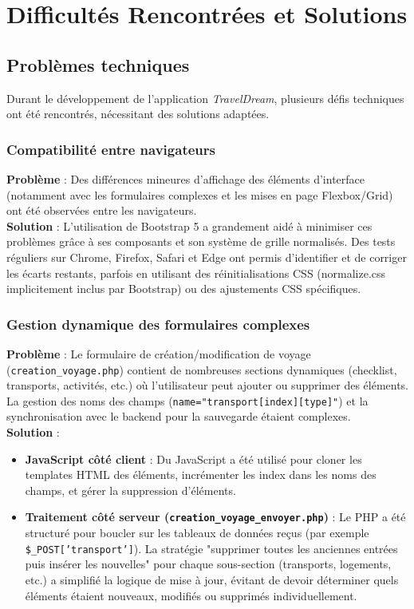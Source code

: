 \documentclass[a4paper,12pt]{article}
\begin{document}
\section{Difficultés Rencontrées et Solutions}

\subsection{Problèmes techniques}
Durant le développement de l’application \textit{TravelDream}, plusieurs défis techniques ont été rencontrés, nécessitant des solutions adaptées.

\subsubsection{Compatibilité entre navigateurs}
\textbf{Problème} : Des différences mineures d'affichage des éléments d'interface (notamment avec les formulaires complexes et les mises en page Flexbox/Grid) ont été observées entre les navigateurs. \\
\textbf{Solution} : L'utilisation de Bootstrap 5 a grandement aidé à minimiser ces problèmes grâce à ses composants et son système de grille normalisés. Des tests réguliers sur Chrome, Firefox, Safari et Edge ont permis d'identifier et de corriger les écarts restants, parfois en utilisant des réinitialisations CSS (normalize.css implicitement inclus par Bootstrap) ou des ajustements CSS spécifiques.

\subsubsection{Gestion dynamique des formulaires complexes}
\textbf{Problème} : Le formulaire de création/modification de voyage (\texttt{creation\_voyage.php}) contient de nombreuses sections dynamiques (checklist, transports, activités, etc.) où l'utilisateur peut ajouter ou supprimer des éléments. La gestion des noms des champs (\texttt{name="transport[index][type]"}) et la synchronisation avec le backend pour la sauvegarde étaient complexes. \\
\textbf{Solution} :
\begin{itemize}
    \item \textbf{JavaScript côté client} : Du JavaScript a été utilisé pour cloner les templates HTML des éléments, incrémenter les index dans les noms des champs, et gérer la suppression d'éléments.
    \item \textbf{Traitement côté serveur (\texttt{creation\_voyage\_envoyer.php})} : Le PHP a été structuré pour boucler sur les tableaux de données reçus (par exemple \texttt{\$\_POST['transport']}). La stratégie "supprimer toutes les anciennes entrées puis insérer les nouvelles" pour chaque sous-section (transports, logements, etc.) a simplifié la logique de mise à jour, évitant de devoir déterminer quels éléments étaient nouveaux, modifiés ou supprimés individuellement.
\end{itemize}
\end{document}
